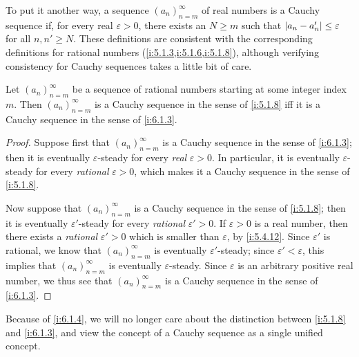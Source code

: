 \begin{note}
  To put it another way, a sequence \((a_n)_{n = m}^\infty\) of real numbers is a Cauchy sequence if, for every real \(\varepsilon > 0\), there exists an \(N \geq m\) such that \(\left\lvert a_n - a_n'\right\rvert \leq \varepsilon\) for all \(n, n' \geq N\).
  These definitions are consistent with the corresponding definitions for rational numbers (\cref{i:5.1.3,i:5.1.6,i:5.1.8}), although verifying consistency for Cauchy sequences takes a little bit of care.
\end{note}

\begin{prop}\label{i:6.1.4}
  Let \((a_n)_{n = m}^\infty\) be a sequence of rational numbers starting at some integer index \(m\).
  Then \((a_n)_{n = m}^\infty\) is a Cauchy sequence in the sense of \cref{i:5.1.8} iff it is a Cauchy sequence in the sense of \cref{i:6.1.3}.
\end{prop}

\begin{proof}
  Suppose first that \((a_n)_{n = m}^\infty\) is a Cauchy sequence in the sense of \cref{i:6.1.3};
  then it is eventually \(\varepsilon\)-steady for every \emph{real} \(\varepsilon > 0\).
  In particular, it is eventually \(\varepsilon\)-steady for every \emph{rational} \(\varepsilon > 0\), which makes it a Cauchy sequence in the sense of \cref{i:5.1.8}.

  Now suppose that \((a_n)_{n = m}^\infty\) is a Cauchy sequence in the sense of \cref{i:5.1.8};
  then it is eventually \(\varepsilon'\)-steady for every \emph{rational} \(\varepsilon' > 0\).
  If \(\varepsilon > 0\) is a real number, then there exists a \emph{rational} \(\varepsilon' > 0\) which is smaller than \(\varepsilon\), by \cref{i:5.4.12}.
  Since \(\varepsilon'\) is rational, we know that \((a_n)_{n = m}^\infty\) is eventually \(\varepsilon'\)-steady;
  since \(\varepsilon' < \varepsilon\), this implies that \((a_n)_{n = m}^\infty\) is eventually \(\varepsilon\)-steady.
  Since \(\varepsilon\) is an arbitrary positive real number, we thus see that \((a_n)_{n = m}^\infty\) is a Cauchy sequence in the sense of \cref{i:6.1.3}.
\end{proof}

\begin{note}
  Because of \cref{i:6.1.4}, we will no longer care about the distinction between \cref{i:5.1.8} and \cref{i:6.1.3}, and view the concept of a Cauchy sequence as a single unified concept.
\end{note}

